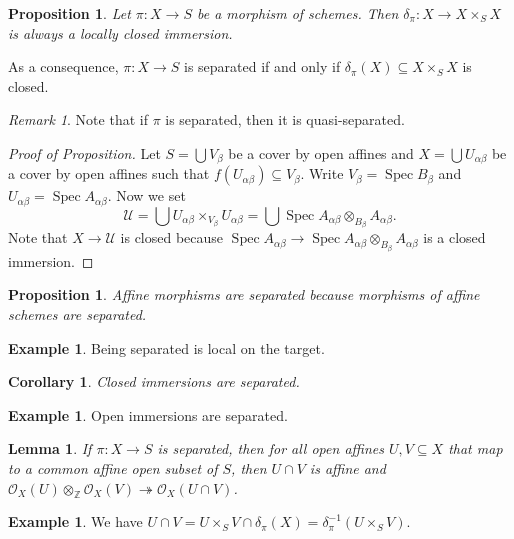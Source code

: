 \documentclass[leqno, openany]{memoir}
\newtheorem{cor}[thm]{Corollary}
\newtheorem{prop}[thm]{Proposition}
\newtheorem{lem}[thm]{Lemma}
\theoremstyle{definition}
\newtheorem{exm}[thm]{Example}
\theoremstyle{remark}
\newtheorem{rmk}[thm]{Remark}
\theoremstyle{plain}
\theoremstyle{definition}
\theoremstyle{remark}
\newcommand{\Z}{\mathbb{Z}}
\newcommand{\mc}[1]{\mathcal{#1}}
\DeclareMathOperator{\Spec}{Spec}
\begin{document}
\begin{prop} Let $\pi \colon X \to S$ be a morphism of schemes. Then
$\delta_{\pi} \colon X \to X \times_S X$ is always a locally closed immersion.
\end{prop}

As a consequence, $\pi \colon X \to S$ is separated if and only if
$\delta_{\pi}(X) \subseteq X \times_S X$ is closed.

\begin{rmk} Note that if $\pi$ is separated, then it is quasi-separated.
\end{rmk}

\begin{proof}[Proof of Proposition] Let $S = \bigcup V_{\beta}$ be a cover by
    open affines and $X = \bigcup U_{\alpha\beta}$ be a cover by open affines
    such that $f(U_{\alpha\beta}) \subseteq V_{\beta}$. Write $V_{\beta} =
    \Spec B_{\beta}$ and $U_{\alpha\beta} = \Spec A_{\alpha\beta}$. Now we set
    \[ \mc{U} = \bigcup U_{\alpha\beta} \times_{V_{\beta}} U_{\alpha\beta} =
    \bigcup \Spec A_{\alpha\beta} \otimes_{B_{\beta}} A_{\alpha\beta}. \] Note
    that $X \to \mc{U}$ is closed because $\Spec A_{\alpha\beta} \to \Spec
    A_{\alpha\beta} \otimes_{B_{\beta}} A_{\alpha\beta}$ is a closed immersion.
\end{proof}

\begin{prop} Affine morphisms are separated because morphisms of affine schemes
are separated.  \end{prop}

\begin{exm} Being separated is local on the target.  \end{exm}

\begin{cor} Closed immersions are separated.  \end{cor}

\begin{exm} Open immersions are separated.  \end{exm}

\begin{lem} If $\pi \colon X \to S$ is separated, then for all open affines $U,
    V \subseteq X$ that map to a common affine open subset of $S$, then $U \cap
    V$ is affine and $\mc{O}_X(U) \otimes_{\Z} \mc{O}_X(V) \twoheadrightarrow
    \mc{O}_X(U \cap V)$.  \end{lem}

\begin{exm} We have $U \cap V = U \times_S V \cap \delta_{\pi}(X) =
\delta_{\pi}^{-1}(U \times_S V)$.  \end{exm}
\end{document}
